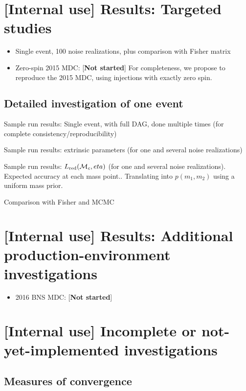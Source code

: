 \documentclass[twocolumn,prd,nofootinbib]{revtex4}
\newcommand\ForInternalReference[1]{#1}
\newcommand\mc{{{\cal M}_c}}
\begin{document}
\ForInternalReference{

\section{[Internal use] Results: Targeted studies}

\begin{itemize}
\item Single event, 100 noise realizations, plus comparison with Fisher matrix

\item Zero-spin 2015 MDC: [\textbf{Not started}]  For completeness, we propose to reproduce the 2015 MDC,  using
  injections with exactly zero spin.

\end{itemize}

\subsection{Detailed investigation of one event}
Sample run results: Single event, with full DAG, done multiple times (for complete consistency/reproducibility)

Sample run results: extrinsic parameters (for one and several noise realizations)

Sample run results: $L_{\rm red}(\mc,eta)$ (for one and several noise realizations). Expected accuracy at each mass
point.. Translating into  $p(m_1,m_2)$ using a uniform mass prior.

Comparison with Fisher and MCMC


\section{[Internal use] Results: Additional production-environment investigations}

\begin{itemize}
\item 2016 BNS MDC: [\textbf{Not started}]

\end{itemize}

\section{[Internal use] Incomplete or not-yet-implemented investigations}

\subsection{Measures of convergence}

}
\end{document}
